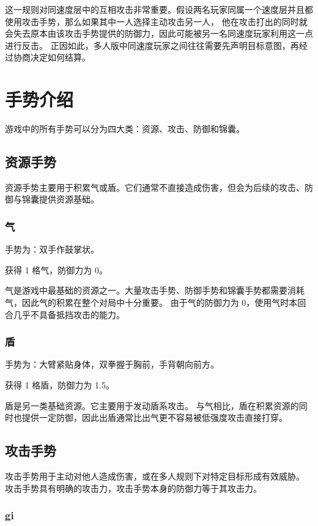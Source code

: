 \documentclass[12pt]{ctexart}
\begin{document}
这一规则对同速度层中的互相攻击非常重要。假设两名玩家同属一个速度层并且都使用攻击手势，那么如果其中一人选择主动攻击另一人，
他在攻击打出的同时就会失去原本由该攻击手势提供的防御力，因此可能被另一名同速度玩家利用这一点进行反击。
正因如此，多人版中同速度玩家之间往往需要先声明目标意图，再经过协商决定如何结算。

\section{手势介绍}

游戏中的所有手势可以分为四大类：资源、攻击、防御和锦囊。

\subsection{资源手势}

资源手势主要用于积累气或盾。它们通常不直接造成伤害，但会为后续的攻击、防御与锦囊提供资源基础。

\subsubsection{气}

手势为：双手作鼓掌状。

获得 1 格气，防御力为 0。

气是游戏中最基础的资源之一。大量攻击手势、防御手势和锦囊手势都需要消耗气，因此气的积累在整个对局中十分重要。
由于气的防御力为 0，使用气时本回合几乎不具备抵挡攻击的能力。

\subsubsection{盾}

手势为：大臂紧贴身体，双拳握于胸前，手背朝向前方。

获得 1 格盾，防御力为 1.5。

盾是另一类基础资源。它主要用于发动盾系攻击。
与气相比，盾在积累资源的同时也提供一定防御，因此出盾通常比出气更不容易被低强度攻击直接打穿。

\subsection{攻击手势}

攻击手势用于主动对他人造成伤害，或在多人规则下对特定目标形成有效威胁。
攻击手势具有明确的攻击力，攻击手势本身的防御力等于其攻击力。

\subsubsection{gi}
\end{document}

